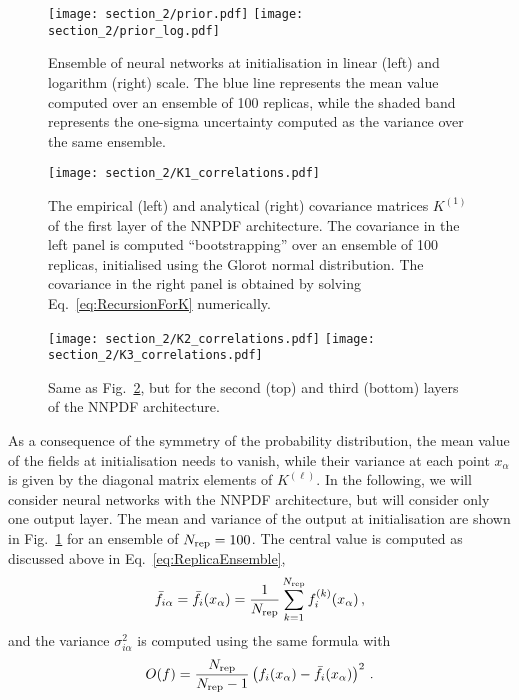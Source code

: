 \begin{figure}[t]
    \centering
    \texttt{[image: section\_2/prior.pdf]}
    \texttt{[image: section\_2/prior\_log.pdf]}
    \caption{Ensemble of neural networks at initialisation in linear (left) and logarithm (right) scale.
    The blue line represents the mean value computed over an ensemble of 100 replicas, while the
    shaded band represents the one-sigma uncertainty computed as the variance over the same ensemble.
    }        
    \label{fig:prior} 
\end{figure}
\begin{figure}[t]
    \centering
    \texttt{[image: section\_2/K1\_correlations.pdf]}
    \caption{The empirical (left) and analytical (right) covariance matrices $K^{(1)}$ of the first layer
    of the NNPDF architecture. The covariance in the left panel is computed ``bootstrapping'' over an
    ensemble of 100 replicas, initialised using the Glorot normal distribution. The covariance in the right
    panel is obtained by solving Eq.~\eqref{eq:RecursionForK} numerically.
    \label{Fig:KRecursionOne}
    }
\end{figure}

\begin{figure}[t]
    \centering
    \texttt{[image: section\_2/K2\_correlations.pdf]}
    \hspace{0.5cm}
    \texttt{[image: section\_2/K3\_correlations.pdf]}
    \caption{Same as Fig.~\ref{Fig:KRecursionOne}, but for the second (top) and
    third (bottom) layers of the NNPDF architecture.}
    \label{Fig:KRecursionTwo}
\end{figure}


As a consequence of the symmetry of the probability distribution, the mean value
of the fields at initialisation needs to vanish, while their variance at each
point $x_\alpha$ is given by the diagonal matrix elements of $K^{(\ell)}$. In
the following, we will consider neural networks with the NNPDF architecture, but
will consider only one output layer. The mean and variance of the output at
initialisation are shown in Fig.~\ref{fig:prior} for an ensemble of
$N_{\rm rep}=100$. The central value is computed as discussed above in
Eq.~\eqref{eq:ReplicaEnsemble},
\begin{align}
    \label{eq:MeanValAtInit}
    \bar{f}_{i\alpha} = \bar{f}_{i}(x_\alpha) = \frac{1}{N_{\rm rep}} \sum_{k=1}^{N_{\rm rep}} f^{(k)}_i(x_\alpha)\, ,
\end{align}
and the variance $\sigma^2_{i\alpha}$ is computed using the same formula with
\begin{align}
    \label{eq:VarAtInit}
    O(f) = \frac{N_{\rm rep}}{N_{\rm rep}-1} \left(f_i(x_\alpha) - \bar{f}_{i}(x_\alpha)\right)^2\, .
\end{align}

\FloatBarrier

